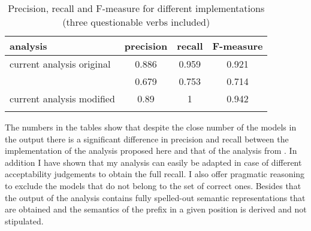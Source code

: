   \begin{table}
 \caption{Precision, recall and F-measure for different implementations (three questionable verbs included) \label{table:precision2}}
  \centering
 \begin{tabular}{l  *{3}{S[table-format=1.3]}}
 \lsptoprule
 analysis & {precision} & {recall} & {F-measure}\\ \midrule
 current analysis original & 0.886 & 0.959 &  0.921\\
 \citet{Tatevosov:09} & 0.679 & 0.753 & 0.714\\
 current analysis modified &  0.89 & 1 & 0.942\\
 \lspbottomrule
 \end{tabular}
 \end{table}
 
The numbers in the tables show that despite the close number of the models in the output there is a significant difference in precision and recall between the implementation of the analysis proposed here and that of the analysis from \citet{Tatevosov:09}. In addition I have shown that my analysis can easily be adapted in case of different acceptability judgements to obtain the full recall. I also offer pragmatic reasoning to exclude the models that do not belong to the set of correct ones. Besides that the output of the analysis contains fully spelled-out semantic representations that are obtained  and the semantics of the prefix in a given position is derived and not stipulated.
